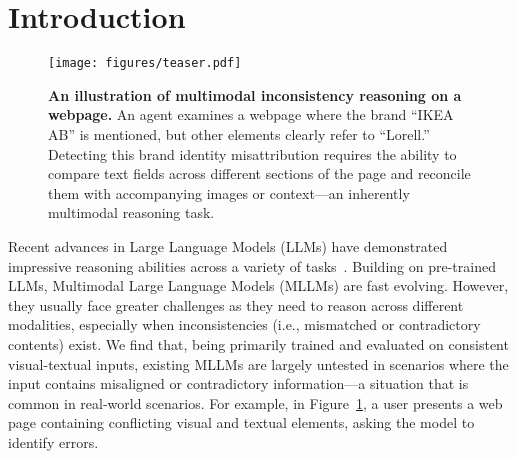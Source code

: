 \section{Introduction}

\begin{figure}[h!]
\setlength\tabcolsep{0pt}
\setlength{\abovecaptionskip}{0.1cm}
    \centering
    \texttt{[image: figures/teaser.pdf]}
    \caption{\textbf{An illustration of multimodal inconsistency reasoning on a webpage.} An agent examines a webpage where the brand “IKEA AB” is mentioned, but other elements clearly refer to “Lorell.” Detecting this brand identity misattribution requires the ability to compare text fields across different sections of the page and reconcile them with accompanying images or context—an inherently multimodal reasoning task.
    }
    \label{fig:teaser}
\end{figure}

Recent advances in Large Language Models (LLMs) have demonstrated impressive reasoning abilities across a variety of tasks~\cite{openai2024gpto1card, guo2025deepseek, kojima2022large, chain-of-thought}. Building on pre-trained LLMs, Multimodal Large Language Models (MLLMs) are fast evolving. However, they usually face greater challenges as they need to reason across different modalities, especially when inconsistencies (i.e., mismatched or contradictory contents) exist. We find that, being primarily trained and evaluated on consistent visual-textual inputs, existing MLLMs are largely untested in scenarios where the input contains misaligned or contradictory information—a situation that is common in real-world scenarios. For example, in Figure~\ref{fig:teaser}, a user presents a web page containing conflicting visual and textual elements, asking the model to identify errors.



